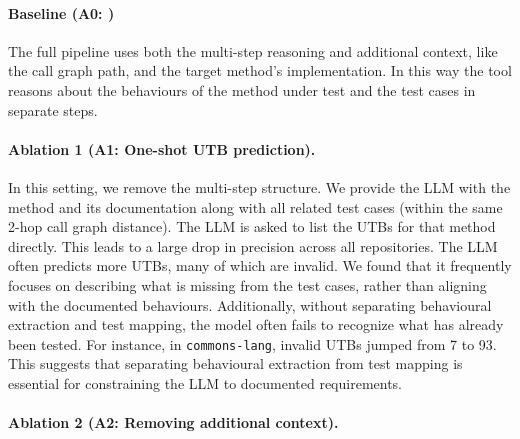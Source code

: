 \paragraph{Baseline (A0: \toolname)} 
The full pipeline uses both the multi-step reasoning and additional context, like the call graph path, and the target method's implementation. 
In this way the tool reasons about the behaviours of the method under test and the test cases in separate steps.

\paragraph{Ablation 1 (A1: One-shot UTB prediction).}

In this setting, we remove the multi-step structure. We provide the LLM with the method and its documentation along with all related test cases (within the same 2-hop call graph distance). The LLM is asked to list the UTBs for that method directly.
%
This leads to a large drop in precision across all repositories. The LLM often predicts more UTBs, many of which are invalid. We found that it frequently focuses on describing what is missing from the test cases, rather than aligning with the documented behaviours. Additionally, without separating behavioural extraction and test mapping, the model often fails to recognize what has already been tested. For instance, in \texttt{commons-lang}, invalid UTBs jumped from 7 to 93. This suggests that separating behavioural extraction from test mapping is essential for constraining the LLM to documented requirements.

\paragraph{Ablation 2 (A2: Removing additional context).}

